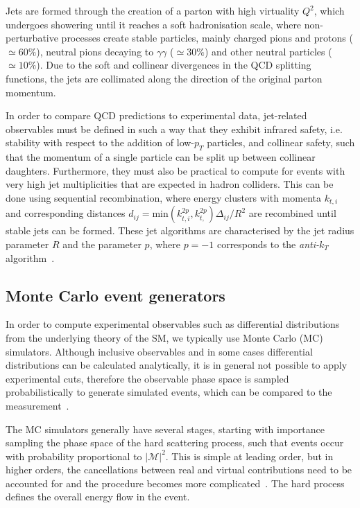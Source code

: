 Jets are formed through the creation of a parton with high virtuality $Q^2$, which undergoes showering until it reaches a soft hadronisation scale, where non-perturbative processes create stable particles, mainly charged pions and protons ($\simeq 60\%$), neutral pions decaying to $\gamma\gamma$ ($\simeq30\%$) and other neutral particles ($\simeq 10\%$). Due to the soft and collinear divergences in the QCD splitting functions, the jets are collimated along the direction of the original parton momentum.

In order to compare QCD predictions to experimental data, jet-related observables must be defined in such a way that they exhibit infrared safety, i.e. stability with respect to the addition of low-$p_T$ particles, and collinear safety, such that the momentum of a single particle can be split up between collinear daughters. Furthermore, they must also be practical to compute for events with very high jet multiplicities that are expected in hadron colliders. This can be done using sequential recombination, where energy clusters with momenta $k_{t,i}$ and corresponding distances $d_{ij} = \mathrm{min}(k_{t,i}^{2p}, k_{t,}^{2p}) \Delta_{ij} / R^2$ are recombined until stable jets can be formed. These jet algorithms are characterised by the jet radius parameter $R$ and the parameter $p$, where $p=-1$ corresponds to the \textit{anti-$k_T$} algorithm~\cite{Cacciari:2008gp}.

\subsection{Monte Carlo event generators}
In order to compute experimental observables such as differential distributions from the underlying theory of the SM, we typically use Monte Carlo (MC) simulators. Although inclusive observables and in some cases differential distributions can be calculated analytically, it is in general not possible to apply experimental cuts, therefore the observable phase space is sampled probabilistically to generate simulated events, which can be compared to the measurement~\cite{Sjostrand:2006za}.

The MC simulators generally have several stages, starting with importance sampling the phase space of the hard scattering process, such that events occur with probability proportional to $|\mathcal{M}|^2$. This is simple at leading order, but in higher orders, the cancellations between real and virtual contributions need to be accounted for and the procedure becomes more complicated~\cite{Frixione:2002ik}. The hard process defines the overall energy flow in the event.


